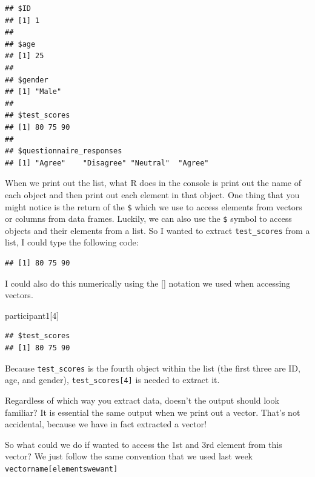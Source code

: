 \documentclass[
]{book}
\newenvironment{Shaded}{\begin{snugshade}}{\end{snugshade}}
\newcommand{\DecValTok}[1]{\textcolor[rgb]{0.00,0.00,0.81}{#1}}
\newcommand{\NormalTok}[1]{#1}
\newcommand{\SpecialCharTok}[1]{\textcolor[rgb]{0.81,0.36,0.00}{\textbf{#1}}}
\begin{document}
\begin{verbatim}
## $ID
## [1] 1
## 
## $age
## [1] 25
## 
## $gender
## [1] "Male"
## 
## $test_scores
## [1] 80 75 90
## 
## $questionnaire_responses
## [1] "Agree"    "Disagree" "Neutral"  "Agree"
\end{verbatim}

When we print out the list, what R does in the console is print out the name of each object and then print out each element in that object. One thing that you might notice is the return of the \texttt{\$} which we use to access elements from vectors or columns from data frames. Luckily, we can also use the \texttt{\$} symbol to access objects and their elements from a list. So I wanted to extract \texttt{test\_scores} from a list, I could type the following code:

\begin{Shaded}
\end{Shaded}

\begin{verbatim}
## [1] 80 75 90
\end{verbatim}

I could also do this numerically using the {[}{]} notation we used when accessing vectors.

\begin{Shaded}
\begin{Highlighting}[]
\NormalTok{participant1[}\DecValTok{4}\NormalTok{]}
\end{Highlighting}
\end{Shaded}

\begin{verbatim}
## $test_scores
## [1] 80 75 90
\end{verbatim}

Because \texttt{test\_scores} is the fourth object within the list (the first three are ID, age, and gender), \texttt{test\_scores{[}4{]}} is needed to extract it.

Regardless of which way you extract data, doesn't the output should look familiar? It is essential the same output when we print out a vector. That's not accidental, because we have in fact extracted a vector!

So what could we do if wanted to access the 1st and 3rd element from this vector? We just follow the same convention that we used last week \texttt{vectorname{[}elementswewant{]}}
\end{document}
